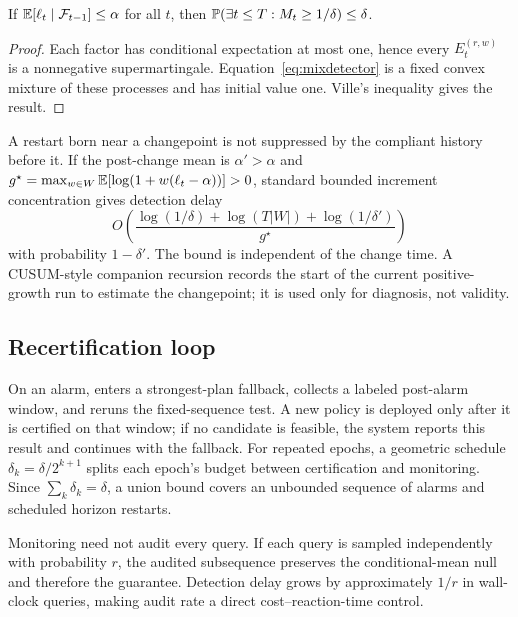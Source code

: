\begin{proposition}
\label{prop:eprocess}
If $\mathbb{E}[\ell_t\mid\mathcal F_{t-1}]\leq\alpha$ for all $t$, then
$\mathbb{P}(\exists t\leq T:M_t\geq1/\delta)\leq\delta$.
\end{proposition}
\begin{proof}
Each factor has conditional expectation at most one, hence every
$E_t^{(r,w)}$ is a nonnegative supermartingale. Equation~\ref{eq:mixdetector}
is a fixed convex mixture of these processes and has initial value one.
Ville's inequality gives the result.
\end{proof}

A restart born near a changepoint is not suppressed by the compliant
history before it. If the post-change mean is $\alpha'>\alpha$ and
$g^\star=\max_{w\in W}\mathbb{E}[\log(1+w(\ell_t-\alpha))]>0$, standard bounded
increment concentration gives detection delay
\[
O\!\left(
\frac{\log(1/\delta)+\log(T|W|)+\log(1/\delta')}{g^\star}
\right)
\]
with probability $1-\delta'$. The bound is independent of the change time.
A CUSUM-style companion recursion records the start of the current
positive-growth run to estimate the changepoint; it is used only for
diagnosis, not validity.

\subsection{Recertification loop}

On an alarm, \system enters a strongest-plan fallback, collects a labeled
post-alarm window, and reruns the fixed-sequence test. A new policy is
deployed only after it is certified on that window; if no candidate is
feasible, the system reports this result and continues with the fallback.
For repeated epochs, a geometric schedule
$\delta_k=\delta/2^{k+1}$ splits each epoch's budget between certification
and monitoring. Since $\sum_k\delta_k=\delta$, a union bound covers an
unbounded sequence of alarms and scheduled horizon restarts.

Monitoring need not audit every query. If each query is sampled
independently with probability $r$, the audited subsequence preserves the
conditional-mean null and therefore the guarantee. Detection delay grows
by approximately $1/r$ in wall-clock queries, making audit rate a direct
cost--reaction-time control.
